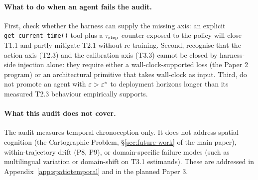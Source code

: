 \paragraph{What to do when an agent fails the audit.}
First, check whether the harness can supply the missing axis: an explicit \texttt{get\_current\_time()} tool plus a $\tau_{\mathrm{step}}$ counter exposed to the policy will close T1.1 and partly mitigate T2.1 without re-training. Second, recognise that the action axis (T2.3) and the calibration axis (T3.3) cannot be closed by harness-side injection alone: they require either a wall-clock-supported loss (the Paper 2 program) or an architectural primitive that takes wall-clock as input. Third, do not promote an agent with $\varepsilon > \varepsilon^{*}$ to deployment horizons longer than its measured T2.3 behaviour empirically supports.

\paragraph{What this audit does not cover.}
The audit measures temporal chronoception only. It does not address spatial cognition (the Cartographic Problem, \S\ref{sec:future-work} of the main paper), within-trajectory drift (P8, P9), or domain-specific failure modes (such as multilingual variation or domain-shift on T3.1 estimands). These are addressed in Appendix~\ref{app:spatiotemporal} and in the planned Paper 3.
